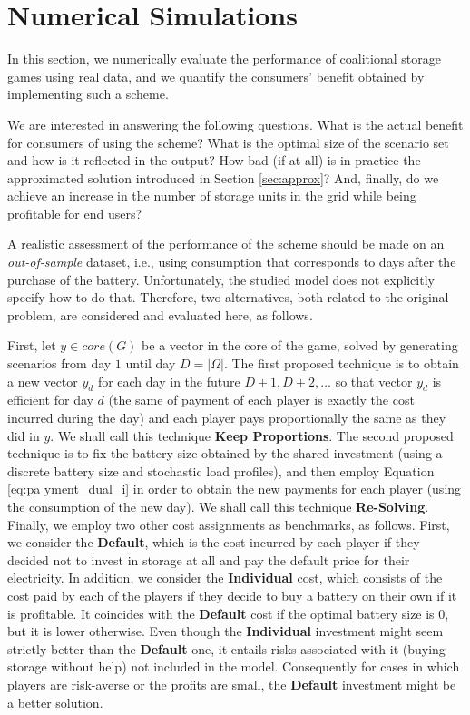 \documentclass[sigconf, table]{acmart}
\begin{document}
\section{Numerical Simulations}

In this section, we numerically evaluate the performance of coalitional storage games using real data, and we quantify the consumers' benefit obtained by implementing such a scheme.

We are interested in answering the following questions. What is the actual benefit for consumers of using the scheme? What is the optimal size of the scenario set and how is it reflected in the output? How bad (if at all) is in practice the approximated solution introduced in Section \ref{sec:approx}? And, finally, do we achieve an increase in the number of storage units in the grid while being profitable for end users? 

A realistic assessment of the performance of the scheme should be made on an \textit{out-of-sample} dataset, i.e., using consumption that corresponds to days after the purchase of the battery. Unfortunately, the studied model does not explicitly specify how to do that. Therefore, two alternatives, both related to the original problem, are considered and evaluated here, as follows.

First, let $y \in core(G)$ be a vector in the core of the game, solved by generating scenarios from day $1$ until day $D=|\Omega|$. The first proposed technique is to obtain a new vector $y_d$ for each day in the future $D+1, D+2, \dots$ so that vector $y_d$ is efficient for day $d$ (the same of payment of each player is exactly the cost incurred during the day) and each player pays proportionally the same as they did in $y$. We shall call this technique \textbf{Keep Proportions}.
The second proposed technique is to fix the battery size obtained by the shared investment (using a discrete battery size and stochastic load profiles), and then employ Equation \eqref{eq:pa
yment_dual_i} in order to obtain the new payments for each player (using the consumption of the new day). We shall call this technique \textbf{Re-Solving}.
Finally, we employ two other cost assignments as benchmarks, as follows. First, we consider the \textbf{Default}, which is the cost incurred by each player if they decided not to invest in storage at all and pay the default price for their electricity. In addition, we consider the \textbf{Individual} cost, which consists of the cost paid by each of the players if they decide to buy a battery on their own if it is profitable. It coincides with the \textbf{Default} cost if the optimal battery size is $0$, but it is lower otherwise. Even though the \textbf{Individual} investment might seem strictly better than the \textbf{Default} one, it entails risks associated with it (buying storage without help) not included in the model. Consequently for cases in which players are risk-averse or the profits are small, the \textbf{Default} investment might be a better solution.
\end{document}
